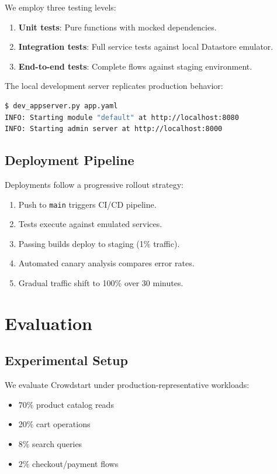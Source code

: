 \documentclass[11pt,twocolumn]{article}
\begin{document}
We employ three testing levels:

\begin{enumerate}
\item \textbf{Unit tests}: Pure functions with mocked dependencies.
\item \textbf{Integration tests}: Full service tests against local Datastore emulator.
\item \textbf{End-to-end tests}: Complete flows against staging environment.
\end{enumerate}

The local development server replicates production behavior:

\begin{lstlisting}[language=bash,caption=Local development]
$ dev_appserver.py app.yaml
INFO: Starting module "default" at http://localhost:8080
INFO: Starting admin server at http://localhost:8000
\end{lstlisting}

\subsection{Deployment Pipeline}

Deployments follow a progressive rollout strategy:

\begin{enumerate}
\item Push to \texttt{main} triggers CI/CD pipeline.
\item Tests execute against emulated services.
\item Passing builds deploy to staging (1\% traffic).
\item Automated canary analysis compares error rates.
\item Gradual traffic shift to 100\% over 30 minutes.
\end{enumerate}

\section{Evaluation}

\subsection{Experimental Setup}

We evaluate Crowdstart under production-representative workloads:

\begin{itemize}
\item 70\% product catalog reads
\item 20\% cart operations
\item 8\% search queries
\item 2\% checkout/payment flows
\end{itemize}
\end{document}
